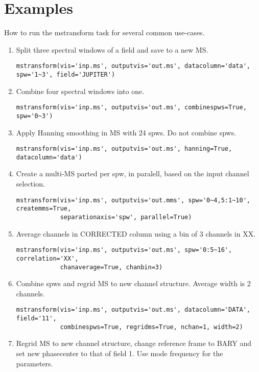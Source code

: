 

\section{Examples}\label{Sec:Examples}
How to run the mstransform task for several common use-cases.

\begin{enumerate}
\item Split three spectral windows of a field and save to a new MS.
\begin{verbatim}
mstransform(vis='inp.ms', outputvis='out.ms', datacolumn='data', spw='1~3', field='JUPITER')
\end{verbatim}
\item Combine four spectral windows into one.
\begin{verbatim}
mstransform(vis='inp.ms', outputvis='out.ms', combinespws=True, spw='0~3')
\end{verbatim}
\item Apply Hanning smoothing in MS with 24 spws. Do not combine spws.
\begin{verbatim}
mstransform(vis='inp.ms', outputvis='out.ms', hanning=True, datacolumn='data')
\end{verbatim}
\item Create a multi-MS parted per spw, in paralell, based on the input channel selection.
\begin{verbatim}
mstransform(vis='inp.ms', outputvis='out.mms', spw='0~4,5:1~10', createmms=True,
            separationaxis='spw', parallel=True)
\end{verbatim}
\item Average channels in CORRECTED column using a bin of 3 channels in XX.
\begin{verbatim}
mstransform(vis='inp.ms', outputvis='out.ms', spw='0:5~16', correlation='XX', 
            chanaverage=True, chanbin=3)
\end{verbatim}
\item Combine spws and regrid MS to new channel structure. Average width is 2 channels.
\begin{verbatim}
mstransform(vis='inp.ms', outputvis='out.ms', datacolumn='DATA', field='11',
            combinespws=True, regridms=True, nchan=1, width=2)
\end{verbatim}
\item Regrid MS to new channel structure, change reference frame to BARY and set
new phasecenter to that of field 1. Use mode frequency for the parameters.

\end{enumerate}
